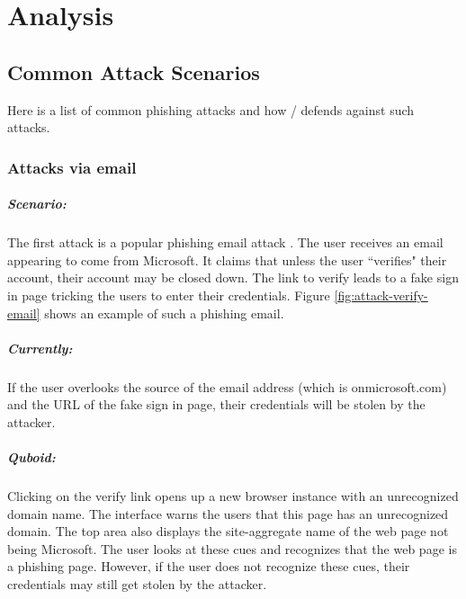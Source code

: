 \chapter{Analysis} \label{chap:analysis}

\section{Common Attack Scenarios}

Here is a list of common phishing attacks and how \namesecureworkstation/ defends against such attacks.

\subsection{Attacks via email}

\paragraph{Scenario:} The first attack is a popular phishing email attack \cite{attack-verify-email}. The user receives an email appearing to come from Microsoft. It claims that unless the user ``verifies" their account, their account may be closed down. The link to verify leads to a fake sign in page tricking the users to enter their credentials. Figure \ref{fig:attack-verify-email} shows an example of such a phishing email.

\paragraph{Currently:} If the user overlooks the source of the email address (which is onmicrosoft.com) and the URL of the fake sign in page, their credentials will be stolen by the attacker.

\paragraph{Quboid:} Clicking on the verify link opens up a new browser instance with an unrecognized domain name. The interface warns the users that this page has an unrecognized domain. The top area also displays the site-aggregate name of the web page not being Microsoft. The user looks at these cues and recognizes that the web page is a phishing page. However, if the user does not recognize these cues, their credentials may still get stolen by the attacker.

